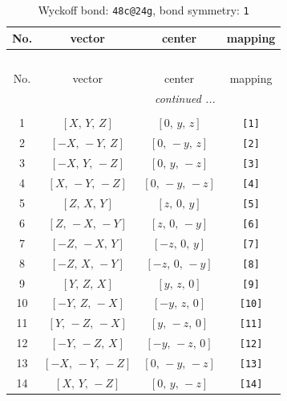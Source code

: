 \documentclass[fleqn,8pt]{jsarticle}
\begin{document}
\begin{longtable}{cccc}
\caption{Wyckoff bond: {\tt 48c@24g}, bond symmetry: {\tt 1}}
 \\
 \hline \hline
No. & vector & center & mapping \\ \hline \endfirsthead

\multicolumn{3}{l}{\tablename\ \thetable{}} \\
 \hline \hline
No. & vector & center & mapping \\ \hline \endhead

 \hline \hline
\multicolumn{3}{r}{\footnotesize\it continued ...} \\ \endfoot

 \hline \hline
\multicolumn{3}{r}{} \\ \endlastfoot

1 & $\left[ X,\, Y,\, Z \right]$ & $\left[ 0,\, y,\, z \right]$ & {\tt [1]} \\ \hline
2 & $\left[ - X,\, - Y,\, Z \right]$ & $\left[ 0,\, - y,\, z \right]$ & {\tt [2]} \\ \hline
3 & $\left[ - X,\, Y,\, - Z \right]$ & $\left[ 0,\, y,\, - z \right]$ & {\tt [3]} \\ \hline
4 & $\left[ X,\, - Y,\, - Z \right]$ & $\left[ 0,\, - y,\, - z \right]$ & {\tt [4]} \\ \hline
5 & $\left[ Z,\, X,\, Y \right]$ & $\left[ z,\, 0,\, y \right]$ & {\tt [5]} \\ \hline
6 & $\left[ Z,\, - X,\, - Y \right]$ & $\left[ z,\, 0,\, - y \right]$ & {\tt [6]} \\ \hline
7 & $\left[ - Z,\, - X,\, Y \right]$ & $\left[ - z,\, 0,\, y \right]$ & {\tt [7]} \\ \hline
8 & $\left[ - Z,\, X,\, - Y \right]$ & $\left[ - z,\, 0,\, - y \right]$ & {\tt [8]} \\ \hline
9 & $\left[ Y,\, Z,\, X \right]$ & $\left[ y,\, z,\, 0 \right]$ & {\tt [9]} \\ \hline
10 & $\left[ - Y,\, Z,\, - X \right]$ & $\left[ - y,\, z,\, 0 \right]$ & {\tt [10]} \\ \hline
11 & $\left[ Y,\, - Z,\, - X \right]$ & $\left[ y,\, - z,\, 0 \right]$ & {\tt [11]} \\ \hline
12 & $\left[ - Y,\, - Z,\, X \right]$ & $\left[ - y,\, - z,\, 0 \right]$ & {\tt [12]} \\ \hline
13 & $\left[ - X,\, - Y,\, - Z \right]$ & $\left[ 0,\, - y,\, - z \right]$ & {\tt [13]} \\ \hline
14 & $\left[ X,\, Y,\, - Z \right]$ & $\left[ 0,\, y,\, - z \right]$ & {\tt [14]} \\ \hline

\end{longtable}
\end{document}
